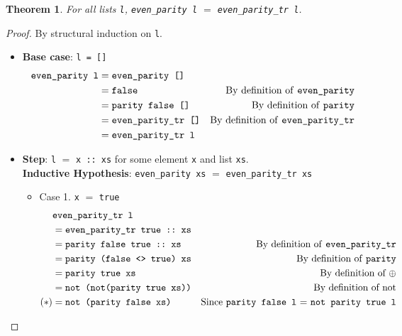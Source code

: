 \documentclass[12pt]{article}
\theoremstyle{plain}
\newtheorem*{thm}{Theorem}
\begin{document}
\onehalfspacing
\begin{thm}
  For all lists \texttt{l}, \texttt{even\_parity l} $=$ \texttt{even\_parity\_tr l}.
\end{thm}
\begin{proof}
  By structural induction on \texttt{l}.
  \begin{itemize}
  \item \textbf{Base case}: \texttt{l = []}
    \begin{align*}
      \texttt{even\_parity l} &= \texttt{even\_parity []} &
      \\ & =
           \texttt{false} & \text{By definition of \texttt              {even\_parity}}
      \\ & = \texttt{parity false []} & \text{By                           definition of \texttt{parity}}
      \\ & =
           \texttt{even\_parity\_tr
           []} & \text{By definition of \texttt{even\_parity\_tr}}
      \\ & = \texttt{even\_parity\_tr l}
    \end{align*}
  \item \textbf{Step}: \texttt{l} $=$ \texttt{x ::\ xs} for some element
    \texttt{x} and list \texttt{xs}.
    \\ \textbf{Inductive Hypothesis}: \texttt{even\_parity xs} $=$
    \texttt{even\_parity\_tr xs}
    \begin{itemize}
    \item Case 1. \texttt{x} $=$ \texttt{true}
      \begin{align*}
        & \texttt{even\_parity\_tr l}
        \\ & = \texttt{even\_parity\_tr true ::\ xs}
        \\ & = \texttt{parity false true ::\ xs} & \text{By              definition of \texttt{even\_parity\_tr}}
        \\ & = \texttt{parity (false <> true) xs} & \text{By
                                                    definition of \texttt{parity}}
        \\ & = \texttt{parity true xs} & \text{By definition of $\oplus$}
        \\ & = \texttt{not (not(parity true xs))} & \text{By definition
                                                  of not}
        \\  (*) & = \texttt{not (parity false xs)} & \text{Since
                                                 \texttt{parity false
                                                 l} $=$ \texttt{not parity true l}}

\end{align*}
\end{itemize}
\end{itemize}
\end{proof}
\end{document}

